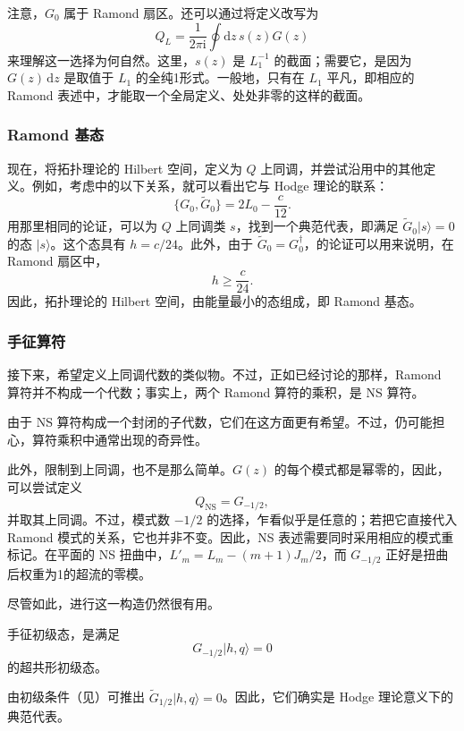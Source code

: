 注意，$G_0$ 属于 Ramond 扇区。还可以通过将定义改写为
\[
Q_L=\frac1{2\pi\mathrm{i}}\oint\mathrm{d}z\,s(z)G(z)
\]
来理解这一选择为何自然。这里，$s(z)$ 是 $L_1^{-1}$ 的截面；需要它，是因为 $G(z)\,\mathrm{d}z$ 是取值于 $L_1$ 的全纯1形式。一般地，只有在 $L_1$ 平凡，即相应的 Ramond 表述中，才能取一个全局定义、处处非零的这样的截面。

\subsubsection{Ramond 基态}\label{sec:3.3.4.1}

现在，将拓扑理论的 Hilbert 空间，定义为 $Q$ 上同调，并尝试沿用中的其他定义。例如，考虑中的以下关系，就可以看出它与 Hodge 理论的联系：
\begin{equation}\label{eq:3.94}
\{G_0,\widetilde G_0\}=2L_0-\frac c{12}.
\end{equation}
用那里相同的论证，可以为 $Q$ 上同调类 $s$，找到一个典范代表，即满足 $\widetilde G_0|s\rangle=0$ 的态 $|s\rangle$。这个态具有 $h=c/24$。此外，由于 $\widetilde G_0=G_0^\dagger$，的论证可以用来说明，在 Ramond 扇区中，
\[
h\ge\frac c{24}.
\]
因此，拓扑理论的 Hilbert 空间，由能量最小的态组成，即 Ramond 基态。

\subsubsection{手征算符}\label{sec:3.3.4.2}

接下来，希望定义上同调代数的类似物。不过，正如已经讨论的那样，Ramond 算符并不构成一个代数；事实上，两个 Ramond 算符的乘积，是 NS 算符。

由于 NS 算符构成一个封闭的子代数，它们在这方面更有希望。不过，仍可能担心，算符乘积中通常出现的奇异性。

此外，限制到上同调，也不是那么简单。$G(z)$ 的每个模式都是幂零的，因此，可以尝试定义
\[
Q_{\mathrm{NS}}=G_{-1/2},
\]
并取其上同调。不过，模式数 $-1/2$ 的选择，乍看似乎是任意的；若把它直接代入 Ramond 模式的关系，它也并非不变。因此，NS 表述需要同时采用相应的模式重标记。在平面的 NS 扭曲中，$L'_m=L_m-(m+1)J_m/2$，而 $G_{-1/2}$ 正好是扭曲后权重为1的超流的零模。

尽管如此，进行这一构造仍然很有用。
\begin{definition*}\label{def:3.chiral-primary-state}
手征初级态，是满足
\[
G_{-1/2}|h,q\rangle=0
\]
的超共形初级态。
\end{definition*}
由初级条件（见）可推出 $\widetilde G_{1/2}|h,q\rangle=0$。因此，它们确实是 Hodge 理论意义下的典范代表。

